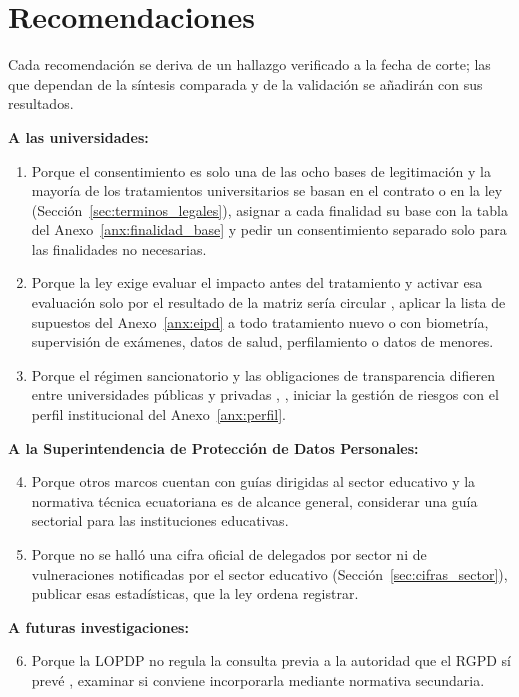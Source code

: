 \section{Recomendaciones}

Cada recomendación se deriva de un hallazgo verificado a la fecha de corte; las que dependan de la síntesis comparada y de la validación se añadirán con sus resultados.

\textbf{A las universidades:}
\begin{enumerate}
  \item Porque el consentimiento es solo una de las ocho bases de legitimación y la mayoría de los tratamientos universitarios se basan en el contrato o en la ley (Sección~\ref{sec:terminos_legales}), asignar a cada finalidad su base con la tabla del Anexo~\ref{anx:finalidad_base} y pedir un consentimiento separado solo para las finalidades no necesarias.
  \item Porque la ley exige evaluar el impacto antes del tratamiento y activar esa evaluación solo por el resultado de la matriz sería circular \cite[art.~42]{lopdp2021}, aplicar la lista de supuestos del Anexo~\ref{anx:eipd} a todo tratamiento nuevo o con biometría, supervisión de exámenes, datos de salud, perfilamiento o datos de menores.
  \item Porque el régimen sancionatorio y las obligaciones de transparencia difieren entre universidades públicas y privadas \cite[arts.~71 y 72]{lopdp2021}, \cite[arts.~8 y 9]{lotaip2023}, iniciar la gestión de riesgos con el perfil institucional del Anexo~\ref{anx:perfil}.
\end{enumerate}

\textbf{A la Superintendencia de Protección de Datos Personales:}
\begin{enumerate}
  \setcounter{enumi}{3}
  \item Porque otros marcos cuentan con guías dirigidas al sector educativo \cite{anpd2023academicos,nces2004privacy} y la normativa técnica ecuatoriana es de alcance general, considerar una guía sectorial para las instituciones educativas.
  \item Porque no se halló una cifra oficial de delegados por sector ni de vulneraciones notificadas por el sector educativo (Sección~\ref{sec:cifras_sector}), publicar esas estadísticas, que la ley ordena registrar.
\end{enumerate}

\textbf{A futuras investigaciones:}
\begin{enumerate}
  \setcounter{enumi}{5}
  \item Porque la LOPDP no regula la consulta previa a la autoridad que el RGPD sí prevé \cite[art.~36]{rgpd2016}, examinar si conviene incorporarla mediante normativa secundaria.
\end{enumerate}

